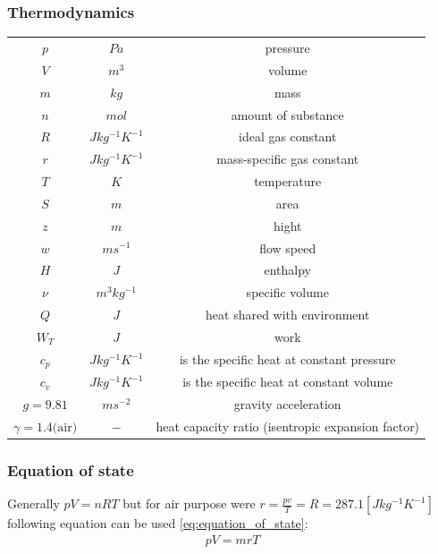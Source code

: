 \documentclass[class=article, crop=false]{standalone}
\begin{document}
\subsubsection{Thermodynamics}
\begin{tabular}{ |c|c|c| }
    \hline
    $p$                     & $Pa$              & pressure \\
    $V$                     & $m^3$             & volume \\
    $m$                     & $kg$              & mass \\
    $n$                     & $mol$             & amount of substance \\
    $R$                     & $Jkg^{-1}K^{-1}$  & ideal gas constant \\
    $r$                     & $Jkg^{-1}K^{-1}$  & mass-specific gas constant \\
    $T$                     & $K$               & temperature \\
    $S$                     & $m$               & area \\
    $z$                     & $m$               & hight \\
    $w$                     & $ms^{-1}$         & flow speed \\
    $H$                     & $J$               & enthalpy \\
    $\nu$                   & $m^3kg^{-1}$      & specific volume \\
    $Q$                     & $J$               & heat shared with
                                                    environment \\
    $W_T$                   & $J$               & work \\
    $c_p$                   & $Jkg^{-1}K^{-1}$  & is the specific heat
                                                    at constant pressure \\
    $c_v$                   & $Jkg^{-1}K^{-1}$  & is the specific heat at constant volume\\
    $g=9.81$                & $ms^{-2}$         & gravity acceleration \\
    $\gamma=1.4\text{(air)}$& $-$               & heat capacity ratio
                                                    (isentropic expansion factor)\\
    \hline
\end{tabular}

\subsubsection{Equation of state}
Generally $pV=nRT$ but for air purpose were $r=\frac{pv}{T}=R=287.1 [Jkg^{-1}K^{-1}]$
following equation can be used \ref{eq:equation_of_state}:
\begin{align}
    pV = mrT
    \label{eq:equation_of_state}
\end{align} 
\end{document}
